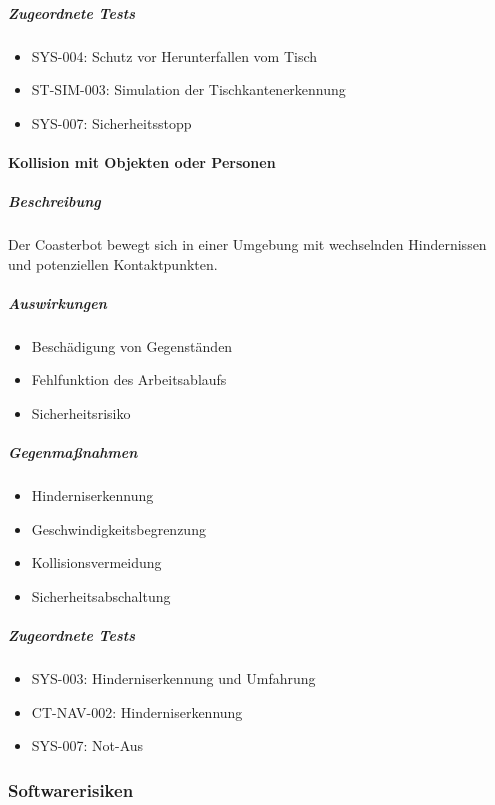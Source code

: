 \documentclass[
  a4paper,
  12pt,
  DIV=12,        %
  parskip=half,  %
  headings=small %
]{scrartcl}
\theoremstyle{definition}
\providecommand{\tightlist}{%
  \setlength{\itemsep}{0pt}\setlength{\parskip}{0pt}}
\theoremstyle{definition}
\begin{document}
\subparagraph{Zugeordnete Tests}\label{zugeordnete-tests}

\begin{itemize}
\tightlist
\item
  SYS-004: Schutz vor Herunterfallen vom Tisch
\item
  ST-SIM-003: Simulation der Tischkantenerkennung
\item
  SYS-007: Sicherheitsstopp
\end{itemize}

\paragraph{Kollision mit Objekten oder
Personen}\label{kollision-mit-objekten-oder-personen}

\subparagraph{Beschreibung}\label{beschreibung-2}

Der Coasterbot bewegt sich in einer Umgebung mit wechselnden
Hindernissen und potenziellen Kontaktpunkten.

\subparagraph{Auswirkungen}\label{auswirkungen-2}

\begin{itemize}
\tightlist
\item
  Beschädigung von Gegenständen
\item
  Fehlfunktion des Arbeitsablaufs
\item
  Sicherheitsrisiko
\end{itemize}

\subparagraph{Gegenmaßnahmen}\label{gegenmauxdfnahmen-1}

\begin{itemize}
\tightlist
\item
  Hinderniserkennung
\item
  Geschwindigkeitsbegrenzung
\item
  Kollisionsvermeidung
\item
  Sicherheitsabschaltung
\end{itemize}

\subparagraph{Zugeordnete Tests}\label{zugeordnete-tests-1}

\begin{itemize}
\tightlist
\item
  SYS-003: Hinderniserkennung und Umfahrung
\item
  CT-NAV-002: Hinderniserkennung
\item
  SYS-007: Not-Aus
\end{itemize}

\subsubsection{Softwarerisiken}\label{softwarerisiken}
\end{document}
